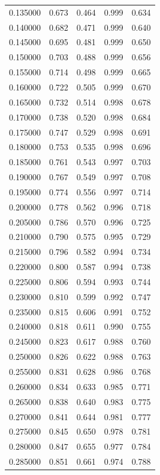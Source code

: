 \begin{table}[htbp]
\begin{tabular}{lllll}
0.135000 & 0.673 & 0.464 & 0.999 & 0.634 \\
0.140000 & 0.682 & 0.471 & 0.999 & 0.640 \\
0.145000 & 0.695 & 0.481 & 0.999 & 0.650 \\
0.150000 & 0.703 & 0.488 & 0.999 & 0.656 \\
0.155000 & 0.714 & 0.498 & 0.999 & 0.665 \\
0.160000 & 0.722 & 0.505 & 0.999 & 0.670 \\
0.165000 & 0.732 & 0.514 & 0.998 & 0.678 \\
0.170000 & 0.738 & 0.520 & 0.998 & 0.684 \\
0.175000 & 0.747 & 0.529 & 0.998 & 0.691 \\
0.180000 & 0.753 & 0.535 & 0.998 & 0.696 \\
0.185000 & 0.761 & 0.543 & 0.997 & 0.703 \\
0.190000 & 0.767 & 0.549 & 0.997 & 0.708 \\
0.195000 & 0.774 & 0.556 & 0.997 & 0.714 \\
0.200000 & 0.778 & 0.562 & 0.996 & 0.718 \\
0.205000 & 0.786 & 0.570 & 0.996 & 0.725 \\
0.210000 & 0.790 & 0.575 & 0.995 & 0.729 \\
0.215000 & 0.796 & 0.582 & 0.994 & 0.734 \\
0.220000 & 0.800 & 0.587 & 0.994 & 0.738 \\
0.225000 & 0.806 & 0.594 & 0.993 & 0.744 \\
0.230000 & 0.810 & 0.599 & 0.992 & 0.747 \\
0.235000 & 0.815 & 0.606 & 0.991 & 0.752 \\
0.240000 & 0.818 & 0.611 & 0.990 & 0.755 \\
0.245000 & 0.823 & 0.617 & 0.988 & 0.760 \\
0.250000 & 0.826 & 0.622 & 0.988 & 0.763 \\
0.255000 & 0.831 & 0.628 & 0.986 & 0.768 \\
0.260000 & 0.834 & 0.633 & 0.985 & 0.771 \\
0.265000 & 0.838 & 0.640 & 0.983 & 0.775 \\
0.270000 & 0.841 & 0.644 & 0.981 & 0.777 \\
0.275000 & 0.845 & 0.650 & 0.978 & 0.781 \\
0.280000 & 0.847 & 0.655 & 0.977 & 0.784 \\
0.285000 & 0.851 & 0.661 & 0.974 & 0.788 \\

\end{tabular}
\end{table}
